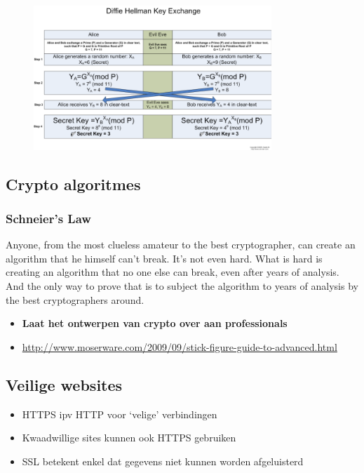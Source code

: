 \documentclass{article}
\newcommand{\bold}[1]{\textbf{#1}}
\begin{document}
\begin{figure}[H]
    \centering
    \includegraphics[width=0.8\textwidth]{diffie-hellman.png}
    \caption{}
\end{figure}

\subsection{Crypto algoritmes}

\subsubsection{Schneier's Law}

Anyone, from the most clueless amateur to the best cryptographer, 
can create an algorithm that he himself can't break. 
It's not even hard. What is hard is creating an algorithm that no one else can break, 
even after years of analysis. 
And the only way to prove that is to subject the algorithm to years of analysis by the best cryptographers around.


\begin{itemize}
    \item \bold{Laat het ontwerpen van crypto over aan professionals}
    \item \url{http://www.moserware.com/2009/09/stick-figure-guide-to-advanced.html}
\end{itemize}

\subsection{Veilige websites}

\begin{itemize}
    \item HTTPS ipv HTTP voor `velige' verbindingen
    \item Kwaadwillige sites kunnen ook HTTPS gebruiken
    \item SSL betekent enkel dat gegevens niet kunnen worden afgeluisterd
\end{itemize}
\end{document}
